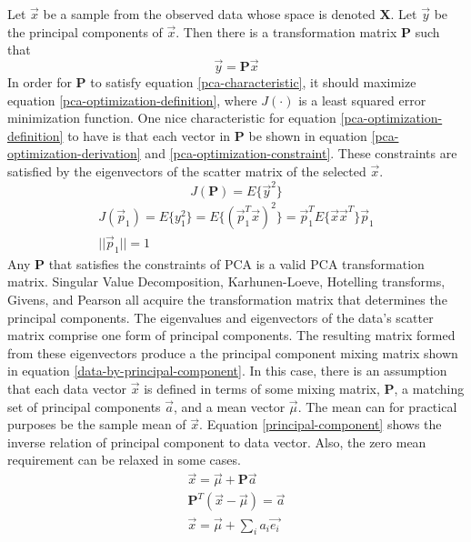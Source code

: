 \documentclass[11pt]{article}
\begin{document}
Let $\vec{x}$ be a sample from the observed data whose space is denoted $\mathbf{X}$.  Let $\vec{y}$ be the principal components of $\vec{x}$.  Then there is a transformation matrix $\mathbf{P}$ such that %
\begin{equation}
\vec{y} = \mathbf{P}\vec{x} \label{pca-characteristic}
\end{equation}
In order for $\mathbf{P}$ to satisfy equation \ref{pca-characteristic},  it should maximize equation \ref{pca-optimization-definition}, where $J(\cdot)$ is a least squared error minimization  function.  One nice characteristic for equation \ref{pca-optimization-definition} to have is that each vector in $\mathbf{P}$ be shown in equation \ref{pca-optimization-derivation} and \ref{pca-optimization-constraint}.  These constraints are satisfied by the eigenvectors of the scatter matrix of the selected $\vec{x}$.  
\begin{equation}
J(\mathbf{P}) = E\{ \vec{y}^2 \}  \label{pca-optimization-definition}
\end{equation}
\begin{eqnarray}
J(\vec{p}_1) = E \{ y^2 _1 \} = E \{ (\vec{p}_1^T \vec{x} )^2 \} = \vec{p}_1 ^T E \{ \vec{x}\vec{x}^T \} \vec{p}_1 \label{pca-optimization-derivation} \\
 || \vec{p}_1 || = 1 \label{pca-optimization-constraint}
\end{eqnarray}
Any $\mathbf{P}$ that satisfies the constraints of PCA is a valid PCA transformation matrix.  
Singular Value Decomposition, Karhunen-Loeve,  Hotelling transforms, Givens, and Pearson all acquire the transformation matrix that determines the principal components.  %
The eigenvalues and eigenvectors of the data's scatter matrix comprise one form of principal components.  The resulting matrix formed from these eigenvectors produce a the principal component mixing matrix shown in equation \ref{data-by-principal-component}.
In this case, there is an assumption that each data vector $\vec{x}$ is defined in terms of some mixing matrix, $\mathbf{P}$, a matching set of principal components $\vec{a}$, and a mean vector $\vec{\mu}$.   The mean can for practical purposes be the sample mean of $\vec{x}$.  
Equation \ref{principal-component} shows the inverse relation of principal component to data vector.  Also, the zero mean requirement can be relaxed in some cases.
\begin{eqnarray}
\vec{x} = \vec{\mu} + \mathbf{P}\vec{a} \label{data-by-principal-component} \\
\mathbf{P}^T(\vec{x} -\vec{\mu}) = \vec{a} \label{principal-component} \\
\vec{x} = \vec{\mu} + \sum _i a_i \vec{e_i} \label{data-by-principal-component-eigenvector} 
\end{eqnarray}
\end{document}
